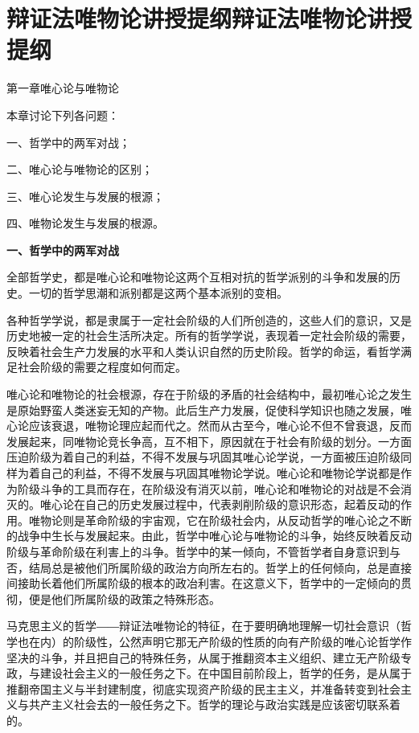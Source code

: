 \section[辩证法唯物论讲授提纲辩证法唯物论讲授提纲]{辩证法唯物论讲授提纲辩证法唯物论讲授提纲}


第一章唯心论与唯物论

本章讨论下列各问题：

一、哲学中的两军对战；

二、唯心论与唯物论的区别；

三、唯心论发生与发展的根源；

四、唯物论发生与发展的根源。

\textbf{一、哲学中的两军对战}

全部哲学史，都是唯心论和唯物论这两个互相对抗的哲学派别的斗争和发展的历史。一切的哲学思潮和派别都是这两个基本派别的变相。

各种哲学学说，都是隶属于一定社会阶级的人们所创造的，这些人们的意识，又是历史地被一定的社会生活所决定。所有的哲学学说，表现着一定社会阶级的需要，反映着社会生产力发展的水平和人类认识自然的历史阶段。哲学的命运，看哲学满足社会阶级的需要之程度如何而定。

唯心论和唯物论的社会根源，存在于阶级的矛盾的社会结构中，最初唯心论之发生是原始野蛮人类迷妄无知的产物。此后生产力发展，促使科学知识也随之发展，唯心论应该衰退，唯物论理应起而代之。然而从古至今，唯心论不但不曾衰退，反而发展起来，同唯物论竞长争高，互不相下，原因就在于社会有阶级的划分。一方面压迫阶级为着自己的利益，不得不发展与巩固其唯心论学说，一方面被压迫阶级同样为着自己的利益，不得不发展与巩固其唯物论学说。唯心论和唯物论学说都是作为阶级斗争的工具而存在，在阶级没有消灭以前，唯心论和唯物论的对战是不会消灭的。唯心论在自己的历史发展过程中，代表剥削阶级的意识形态，起着反动的作用。唯物论则是革命阶级的宇宙观，它在阶级社会内，从反动哲学的唯心论之不断的战争中生长与发展起来。由此，哲学中唯心论与唯物论的斗争，始终反映着反动阶级与革命阶级在利害上的斗争。哲学中的某一倾向，不管哲学者自身意识到与否，结局总是被他们所属阶级的政治方向所左右的。哲学上的任何倾向，总是直接间接助长着他们所属阶级的根本的政冶利害。在这意义下，哲学中的一定倾向的贯彻，便是他们所属阶级的政策之特殊形态。

马克思主义的哲学――辩证法唯物论的特征，在于要明确地理解一切社会意识（哲学也在内）的阶级性，公然声明它那无产阶级的性质的向有产阶级的唯心论哲学作坚决的斗争，并且把自己的特殊任务，从属于推翻资本主义组织、建立无产阶级专政，与建设社会主义的一般任务之下。在中国目前阶段上，哲学的任务，是从属于推翻帝国主义与半封建制度，彻底实现资产阶级的民主主义，并准备转变到社会主义与共产主义社会去的一般任务之下。哲学的理论与政治实践是应该密切联系着的。


